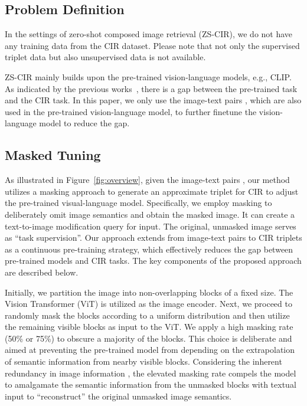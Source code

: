 \documentclass[10pt,twocolumn,letterpaper]{article}
\begin{document}
\subsection{Problem Definition}
In the settings of zero-shot composed image retrieval (ZS-CIR), we do not have any training data from the CIR dataset. Please note that not only the supervised triplet data but also unsupervised data is not available. 

ZS-CIR mainly builds upon the pre-trained vision-language models, e.g., CLIP. As indicated by the previous works~\cite{saito2023pic2word,Baldrati_2023_ICCV}, there is a gap between the pre-trained task and the CIR task. In this paper, we only use the image-text pairs , which are also used in the pre-trained vision-language model, to further finetune the vision-language model to reduce the gap.

\subsection{Masked Tuning}
As illustrated in Figure~\ref{fig:overview}, given the image-text pairs , our method utilizes a masking approach to generate an approximate triplet for CIR to adjust the pre-trained visual-language model. Specifically, we employ masking to deliberately omit image semantics and obtain the masked image. It can create a text-to-image modification query for input. The original, unmasked image serves as ``task supervision''. Our approach extends from image-text pairs to CIR triplets as a continuous pre-training strategy, which effectively reduces the gap between pre-trained models and CIR tasks. The key components of the proposed approach are described below.

Initially, we partition the image into non-overlapping blocks of a fixed size. The Vision Transformer (ViT) \cite{dosovitskiy2020vit} is utilized as the image encoder. Next, we proceed to randomly mask the blocks according to a uniform distribution and then utilize the remaining visible blocks as input to the ViT. We apply a high masking rate (50\% or 75\%) to obscure a majority of the blocks. This choice is deliberate and aimed at preventing the pre-trained model from depending on the extrapolation of semantic information from nearby visible blocks. Considering the inherent redundancy in image information \cite{he2022masked, li2023scaling}, the elevated masking rate compels the model to amalgamate the semantic information from the unmasked blocks with textual input to ``reconstruct'' the original unmasked image semantics.
\end{document}

